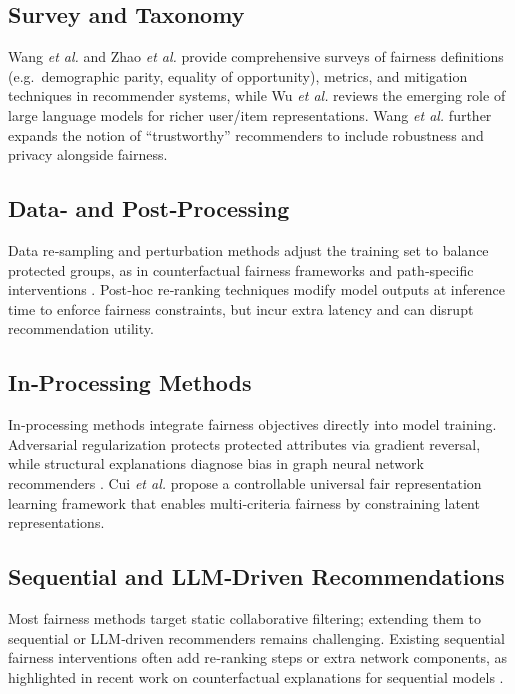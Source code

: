 \documentclass{article}
\begin{document}
\subsection{Survey and Taxonomy}  
Wang \emph{et al.} \cite{Wang2023FairRecSys} and Zhao \emph{et al.} \cite{Zhao2025FairDiversityRecSys} provide comprehensive surveys of fairness definitions (e.g.\ demographic parity, equality of opportunity), metrics, and mitigation techniques in recommender systems, while Wu \emph{et al.} \cite{Wu2024SurveyLLMRec} reviews the emerging role of large language models for richer user/item representations.  Wang \emph{et al.} \cite{Wang2024TrustworthyRecSys} further expands the notion of “trustworthy” recommenders to include robustness and privacy alongside fairness.

\subsection{Data‐ and Post‐Processing}  
Data re‐sampling and perturbation methods adjust the training set to balance protected groups, as in counterfactual fairness frameworks \cite{Wang2024CounterfactualRec} and path‐specific interventions \cite{Zhu2023PathSpecificFairRec}.  Post‐hoc re‐ranking techniques modify model outputs at inference time to enforce fairness constraints, but incur extra latency and can disrupt recommendation utility.

\subsection{In‐Processing Methods}  
In‐processing methods integrate fairness objectives directly into model training.  Adversarial regularization protects protected attributes via gradient reversal, while structural explanations diagnose bias in graph neural network recommenders \cite{Dong2022StructBiasGNN}.  Cui \emph{et al.} \cite{Cui2023ControllableUFRL} propose a controllable universal fair representation learning framework that enables multi‐criteria fairness by constraining latent representations.

\subsection{Sequential and LLM‐Driven Recommendations}  
Most fairness methods target static collaborative filtering; extending them to sequential or LLM‐driven recommenders remains challenging.  Existing sequential fairness interventions often add re‐ranking steps or extra network components, as highlighted in recent work on counterfactual explanations for sequential models \cite{Wang2024CounterfactualRec}.
\end{document}
